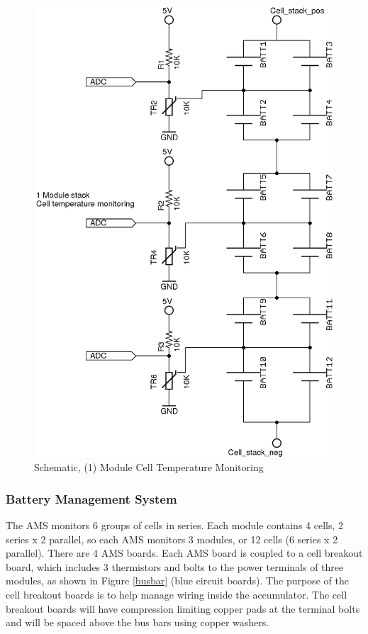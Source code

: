 \documentclass{article}
\begin{document}
            \begin{figure}[H]
            \centering
            \includegraphics[width = 0.5 \textwidth]{celltemp}
            \caption{Schematic, (1) Module Cell Temperature Monitoring}
            \label{celltemp}
            \end{figure}

        \subsubsection{Battery Management System} \label{bms}

            

           The AMS monitors 6 groups of cells in series. Each module contains 4 cells, 2 series x 2 parallel, so each AMS monitors 3 modules, or 12 cells (6 series x 2 parallel). There are 4 AMS boards. Each AMS board is coupled to a cell breakout board, which includes 3 thermistors and bolts to the power terminals of three modules, as shown in Figure \ref{busbar} (blue circuit boards). The purpose of the cell breakout boards is to help manage wiring inside the accumulator. The cell breakout boards will have compression limiting copper pads at the terminal bolts and will be spaced above the bus bars using copper washers.\\
            
\end{document}
